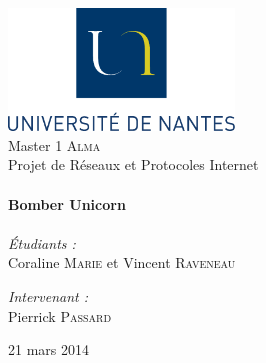 
\begin{titlepage}
	\begin{center}

		\includegraphics[width=0.45\textwidth]{Figures/logoUN.png}~\\[2cm]

		\LARGE{Master 1 \textsc{Alma}}\\[1.5cm]

		\Large{Projet de Réseaux et Protocoles Internet}\\[0.5cm]

		\HRule \\[0.4cm]
		{ \huge \bfseries Bomber Unicorn \\[0.4cm] }
		\HRule \\[1.5cm]

		\normalsize		
		\emph{\'Etudiants :}\\
		Coraline \textsc{Marie} et Vincent \textsc{Raveneau}

		\vspace{0.5cm}

		\emph{Intervenant :} \\
		Pierrick \textsc{Passard}
		
		\vfill

		{\large 21 mars 2014}

	\end{center}
\end{titlepage}

